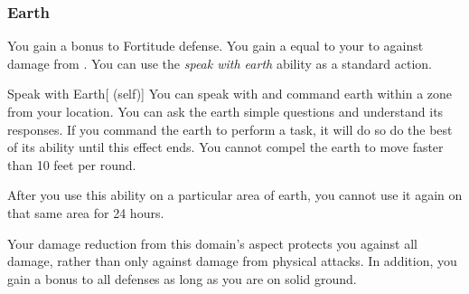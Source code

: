         \subsubsection{Earth}
             You gain a  bonus to Fortitude defense.
             You gain a  equal to your  to  against damage from .
             You can use the \textit{speak with earth} ability as a standard action.
            \begin{attuneability}{Speak with Earth}[ (self)]
                You can speak with and command earth within a \areahuge zone from your location.
                You can ask the earth simple questions and understand its responses.
                If you command the earth to perform a task, it will do so do the best of its ability until this effect ends.
                You cannot compel the earth to move faster than 10 feet per round.

                After you use this ability on a particular area of earth, you cannot use it again on that same area for 24 hours.
            \end{attuneability}
             Your damage reduction from this domain's aspect protects you against all damage, rather than only against damage from physical attacks.
            In addition, you gain a  bonus to all defenses as long as you are on solid ground.


